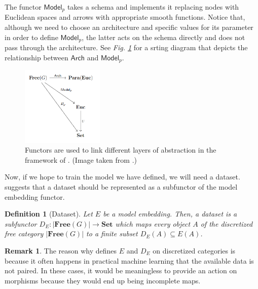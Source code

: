 \documentclass[11pt,a4paper,openright,twoside]{report}
\newcounter{mycounter}
\theoremstyle{plain}
\newtheorem{definition}[mycounter]{Definition}
\theoremstyle{definition}
\newtheorem{remark}[mycounter]{Remark}
\begin{document}
The functor $\mathsf{Model}_p$ takes a schema and implements it replacing nodes with Euclidean spaces and arrows with appropriate smooth functions. Notice that, although we need to choose an architecture and specific values for its parameter in order to define $\mathsf{Model}_p$, the latter acts on the schema directly and does not pass through the architecture. See \textit{Fig. \ref{fig: layers}} for a srting diagram that depicts the relationship between $\mathsf{Arch}$ and $\mathsf{Model}_p$.

\begin{figure}[h]
  \begin{center}
    \includegraphics[width=0.35\textwidth]{figures/layers_of_abstraction.png}     
    \caption[CycleGAN schema]{Functors are used to link different layers of abstraction in the framework of \cite{gavranovic2019compositional}. (Image taken from \cite{gavranovic2019compositional}.)}
    \label{fig: layers}
  \end{center}
\end{figure}

Now, if we hope to train the model we have defined, we will need a dataset. \cite{gavranovic2019compositional} suggests that a dataset should be represented as a subfunctor of the model embedding functor.

\begin{definition}[Dataset]
  Let $E$ be a model embedding. Then, a dataset is a subfunctor $D_E: |\mathbf{Free}(G)| \to \mathbf{Set}$ which maps every object $A$ of the discretized free category $|\mathbf{Free}(G)|$ to a finite subset $D_E(A) \subseteq E(A)$.
\end{definition}

\begin{remark}
  \label{rem: discretized}
  The reason why \cite{gavranovic2019compositional} defines $E$ and $D_E$ on discretized categories is because it often happens in practical machine learning that the available data is not paired. In these cases, it would be meaningless to provide an action on morphisms because they would end up being incomplete maps.
\end{remark}
\end{document}
